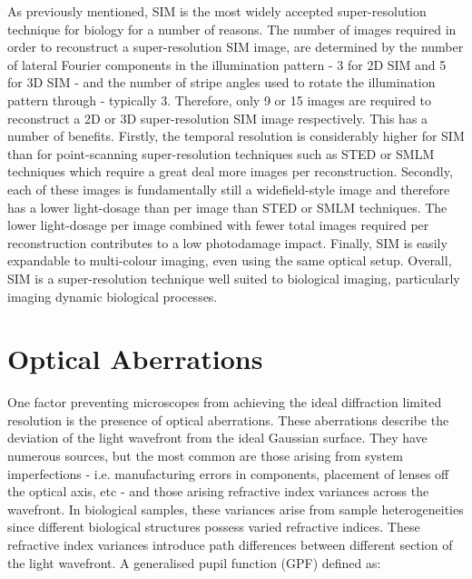 As previously mentioned, SIM is the most widely accepted 
super-resolution technique for biology for a number of reasons. The 
number of images required in order to reconstruct a super-resolution 
SIM image, are determined by the number of lateral Fourier components 
in the illumination pattern - 3 for 2D SIM and 5 for 3D SIM - and the
number of stripe angles used to rotate the illumination pattern through
- typically 3. Therefore, only 9 or 15 images are required to 
reconstruct a 2D or 3D super-resolution SIM image respectively. This
has a number of benefits. Firstly, the temporal resolution is 
considerably higher for SIM than for point-scanning super-resolution
techniques such as STED or SMLM techniques which require a great deal more 
images per reconstruction\cite{leung2011review,schermelleh2019super}.
Secondly, each of these images is fundamentally still a widefield-style
image and therefore has a lower light-dosage than per image than STED 
or SMLM techniques. The lower light-dosage per image combined with fewer
total images required per reconstruction contributes to a low 
photodamage impact. Finally, SIM is easily expandable to multi-colour 
imaging, even using the same optical 
setup\cite{wu2018faster,allen2014structured}. Overall, SIM is a 
super-resolution technique well suited to biological imaging, 
particularly imaging dynamic biological processes.

\section{Optical Aberrations}
\label{sec:aberrations}

One factor preventing microscopes from achieving the ideal diffraction
limited resolution is the presence of optical 
aberrations\cite{goodman2005introduction,wyant1992basic,wolf1951diffraction}.
These aberrations describe the deviation of the light wavefront
from the ideal Gaussian surface. They have numerous sources, but the most
common are those arising from system imperfections - i.e. manufacturing errors
in components, placement of lenses off the optical axis, etc - and those
arising refractive index variances across the 
wavefront\cite{kubby2013adaptive,booth2007adaptive}. In biological samples, 
these variances arise from sample heterogeneities since different biological
structures possess varied refractive 
indices\cite{bashkatov2011optical, jacques2013optical, kim2010measurement, sandell2011review}.
These refractive index variances introduce path differences between 
different section of the light wavefront. A generalised pupil function 
(GPF) defined as\cite{antonello2014optimisation}:

